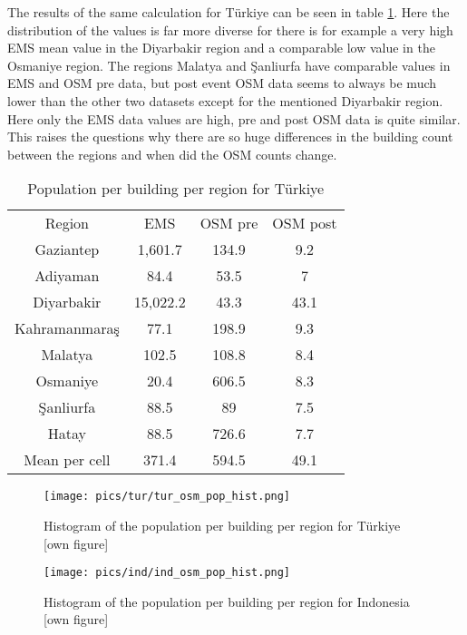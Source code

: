 \documentclass[oneside,twocolumn,10pt,cleanfoot,cleanhead]{asme2ej}
\begin{document}
The results of the same calculation for Türkiye can be seen in table \ref{tur pop per build admin}.
Here the distribution of the values is far more diverse for there is for example a very high EMS mean value in the Diyarbakir region and a comparable low value in the Osmaniye region.
The regions Malatya and Şanliurfa have comparable values in EMS and OSM pre data, but post event OSM data seems to always be much lower than the other two datasets except for the mentioned Diyarbakir region.
Here only the EMS data values are high, pre and post OSM data is quite similar.
This raises the questions why there are so huge differences in the building count between the regions and when did the OSM counts change.

\begin{table}[ht]
    \caption{Population per building per region for Türkiye}
    \begin{center}
        \label{tur pop per build admin}
        \begin{tabular}{c c c c}
            & & \\ %
            \hline
            Region & EMS & OSM pre & OSM post \\
            \hline
            Gaziantep & 1,601.7 & 134.9 & 9.2 \\
            Adiyaman & 84.4 & 53.5 & 7 \\
            Diyarbakir & 15,022.2 & 43.3 & 43.1 \\
            Kahramanmaraş & 77.1 & 198.9 & 9.3 \\
            Malatya & 102.5 & 108.8 & 8.4 \\
            Osmaniye & 20.4 & 606.5 & 8.3 \\
            Şanliurfa & 88.5 & 89 & 7.5 \\
            Hatay & 88.5 & 726.6 & 7.7 \\
            \hline
            Mean per cell & 371.4 & 594.5 & 49.1 \\
            \hline
        \end{tabular}
    \end{center}
\end{table}

\begin{figure}[h!]
    \centerline{\texttt{[image: pics/tur/tur\_osm\_pop\_hist.png]}}
    \caption{Histogram of the population per building per region for Türkiye [own figure]}
    \label{tur hist}
    \vspace{12pt}
    \centerline{\texttt{[image: pics/ind/ind\_osm\_pop\_hist.png]}}
    \caption{Histogram of the population per building per region for Indonesia [own figure]}
    \label{ind hist}
\end{figure}
\end{document}
